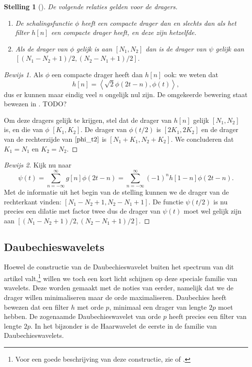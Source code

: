 \documentclass[11pt]{report}
\theoremstyle{plain}
\newtheorem*{stelling}{Stelling}
\theoremstyle{remark}
\begin{document}
\begin{stelling}[{\cite[P7.2]{mallat}}]
  De volgende relaties gelden voor de dragers.
  \begin{enumerate}
    \item De schalingsfunctie $\phi$ heeft een compacte drager dan en slechts dan als het filter $h[n]$ een compacte drager heeft, en deze zijn hetzelfde.
    \item Als de drager van $\phi$ gelijk is aan $[N_1,N_2]$ dan is de drager van $\psi$ gelijk aan $[(N_1 - N_2 + 1)/2, (N_2 - N_1 + 1)/2]$.
  \end{enumerate}
\end{stelling}
\begin{proof}[Bewijs 1] Als $\phi$ een compacte drager heeft dan $h[n]$ ook: we weten dat
\[
  h[n] = \left\langle \sqrt{2} \phi\left(2t-n\right), \phi(t) \right\rangle,
\]
dus er kunnen maar eindig veel $n$ ongelijk nul zijn. De omgekeerde bewering staat bewezen in \cite{daubechies[P965-967]}. TODO?

Om deze dragers gelijk te krijgen, stel dat de drager van $h[n]$ gelijk $[N_1,N_2]$ is, en die van $\phi$ $[K_1, K_2]$. De drager van $\phi(t/2)$ is $[2K_1, 2K_2]$ en de drager van de rechterzijde van $\ref{phi_t2}$ is $[N_1 + K_1, N_2 + K_2]$. We concluderen dat $K_1 = N_1$ en $K_2 = N_2$.
\end{proof}
\begin{proof}[Bewijs 2]
Kijk nu naar
\[
\psi\left(t\right) = \sum_{n=-\infty}^{\infty} g[n] \phi(2t-n) = \sum_{n=-\infty}^{\infty} (-1)^{n}h[1-n] \phi(2t-n).
\]
Met de informatie uit het begin van de stelling kunnen we de drager van de rechterkant vinden: $[N_1 - N_2 + 1, N_2 - N_1 + 1]$. De functie $\psi(t/2)$ is nu precies een dilatie met factor twee dus de drager van $\psi(t)$ moet wel gelijk zijn aan $[(N_1 - N_2 + 1)/2, (N_2 - N_1 + 1)/2]$.
\end{proof}

\subsection{Daubechieswavelets}
Hoewel de constructie van de Daubechieswavelet buiten het spectrum van dit artikel valt,\footnote{Voor een goede beschrijving van deze constructie, zie \cite{mallat} of \cite{daubechies}.} willen we toch een kort licht schijnen op deze speciale familie van wavelets. Deze worden gemaakt met de noties van eerder, namelijk dat we de drager willen minimaliseren maar de orde maximaliseren. Daubechies heeft bewezen\cite{daubechies} dat een filter $h$ met orde $p$, minimaal een drager van lengte $2p$ moet hebben. De zogenaamde Daubechieswavelet van orde $p$ heeft precies een filter van lengte $2p$. In het bijzonder is de Haarwavelet de eerste in de familie van Daubechieswavelets.
\end{document}
